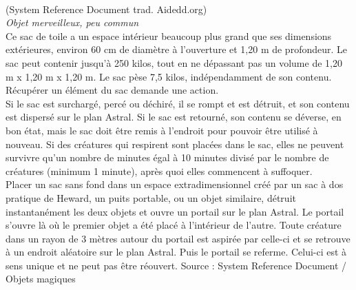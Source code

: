 \\
{\small (System Reference Document trad. Aidedd.org)}\\
{\small \it Objet merveilleux, peu commun}\\
Ce sac de toile a un espace intérieur beaucoup plus grand que ses dimensions extérieures, environ 60 cm de diamètre à l'ouverture et 1,20 m de profondeur. Le sac peut contenir jusqu'à 250 kilos, tout en ne dépassant pas un volume de 1,20 m x 1,20 m x 1,20 m. Le sac pèse 7,5 kilos, indépendamment de son contenu. Récupérer un élément du sac demande une action. \\
Si le sac est surchargé, percé ou déchiré, il se rompt et est détruit, et son contenu est dispersé sur le plan Astral. Si le sac est retourné, son contenu se déverse, en bon état, mais le sac doit être remis à l'endroit pour pouvoir être utilisé à nouveau. Si des créatures qui respirent sont placées dans le sac, elles ne peuvent survivre qu'un nombre de minutes égal à 10 minutes divisé par le nombre de créatures (minimum 1 minute), après quoi elles commencent à suffoquer. \\

Placer un sac sans fond dans un espace extradimensionnel créé par un sac à dos pratique de Heward, un puits portable, ou un objet similaire, détruit instantanément les deux objets et ouvre un portail sur le plan Astral. Le portail s'ouvre là où le premier objet a été placé à l'intérieur de l'autre. Toute créature dans un rayon de 3 mètres autour du portail est aspirée par celle-ci et se retrouve à un endroit aléatoire sur le plan Astral. Puis le portail se referme. Celui-ci est à sens unique et ne peut pas être réouvert.
Source : System Reference Document / Objets magiques

